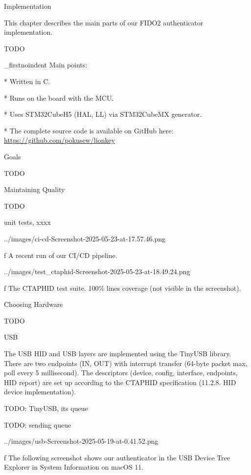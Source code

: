 \chap[implementation] Implementation

This chapter describes the main parts of our FIDO2 authenticator implementation.

TODO

\_firstnoindent
{\sbf Main points:}

\begitems

* Written in {\sbf C}.

* Runs on the  board with the  MCU.

* Uses STM32CubeH5 (HAL, LL) via STM32CubeMX generator.

* The complete source code is available on GitHub here:\nl
\url{https://github.com/pokusew/lionkey}

\enditems


\sec Goals

TODO

\sec Maintaining Quality

TODO

unit tests, xxxx

\midinsert
{}
\picw=144mm \cinspic ../images/ci-cd-Screenshot-2025-05-23-at-17.57.46.png
\caption/f A recent run of our CI/CD pipeline.
\endinsert

\midinsert
{}
\picw=144mm \cinspic ../images/test_ctaphid-Screenshot-2025-05-23-at-18.49.24.png
\caption/f The CTAPHID test suite. 100\% lines coverage (not visible in the screenshot).
\endinsert

\sec Choosing Hardware

TODO


\sec USB

The USB HID and USB layers are implemented using the TinyUSB library.
There are two endpoints (IN, OUT) with interrupt transfer (64-byte packet max, poll every 5 millisecond). The descriptors (device, config, interface, endpoints, HID report) are set up according to the CTAPHID specification (11.2.8. HID device implementation).

TODO: TinyUSB, its queue

TODO: sending queue

\midinsert
{}
\picw=144mm \cinspic ../images/usb-Screenshot-2025-05-19-at-0.41.52.png
\caption/f The following screenshot shows our authenticator in the USB Device Tree Explorer in System Information on macOS 11.

